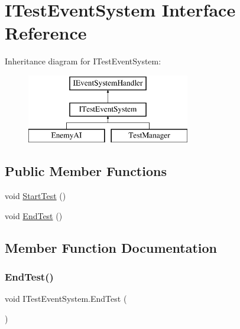 \hypertarget{interface_i_test_event_system}{}\section{I\+Test\+Event\+System Interface Reference}
\label{interface_i_test_event_system}
Inheritance diagram for I\+Test\+Event\+System\+:\begin{figure}[H]
\begin{center}
\leavevmode
\includegraphics[height=3.000000cm]{interface_i_test_event_system}
\end{center}
\end{figure}
\subsection*{Public Member Functions}
\begin{DoxyCompactItemize}
\item 
void \mbox{\hyperlink{interface_i_test_event_system_aefeb7857cc94ecb2bacb47975f6474bb}{Start\+Test}} ()
\item 
void \mbox{\hyperlink{interface_i_test_event_system_ae8eda94179d81c4c839a32432216df7b}{End\+Test}} ()
\end{DoxyCompactItemize}


\subsection{Member Function Documentation}
\mbox{\label{interface_i_test_event_system_ae8eda94179d81c4c839a32432216df7b}} 
\subsubsection{\texorpdfstring{End\+Test()}{EndTest()}}
{\footnotesize\ttfamily void I\+Test\+Event\+System.\+End\+Test (\begin{DoxyParamCaption}{ }\end{DoxyParamCaption})}


